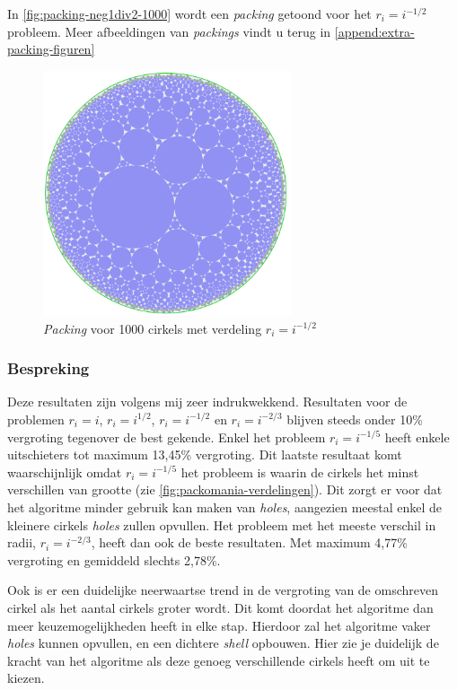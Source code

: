 \documentclass[12pt,a4paper,oneside]{book}
\begin{document}
{In \autoref{fig:packing-neg1div2-1000} wordt een \textit{packing} getoond voor het $r_i = i^{-1/2}$ probleem.
Meer afbeeldingen van \textit{packings} vindt u terug in \autoref{append:extra-packing-figuren}

\begin{figure}
  \centering
  \includegraphics[width=0.65\textwidth]{packing-neg1div2-1000.png}
  \caption{\textit{Packing} voor 1000 cirkels met verdeling $r_i=i^{-1/2}$} \label{fig:packing-neg1div2-1000} 
\end{figure}

\subsubsection{Bespreking}

Deze resultaten zijn volgens mij zeer indrukwekkend.
Resultaten voor de problemen $r_i = i$, $r_i = i^{1/2}$, $r_i = i^{-1/2}$ en $r_i = i^{-2/3}$ blijven steeds onder 10\% vergroting tegenover de best gekende.
Enkel het probleem $r_i = i^{-1/5}$ heeft enkele uitschieters tot maximum 13,45\% vergroting.
Dit laatste resultaat komt waarschijnlijk omdat $r_i = i^{-1/5}$ het probleem is waarin de cirkels het minst verschillen van grootte (zie \autoref{fig:packomania-verdelingen}).
Dit zorgt er voor dat het algoritme minder gebruik kan maken van \textit{holes}, aangezien meestal enkel de kleinere cirkels \textit{holes} zullen opvullen.
Het probleem met het meeste verschil in radii, $r_i = i^{-2/3}$, heeft dan ook de beste resultaten.
Met maximum 4,77\% vergroting en gemiddeld slechts 2,78\%.

Ook is er een duidelijke neerwaartse trend in de vergroting van de omschreven cirkel als het aantal cirkels groter wordt.
Dit komt doordat het algoritme dan meer keuzemogelijkheden heeft in elke stap.
Hierdoor zal het algoritme vaker \textit{holes} kunnen opvullen, en een dichtere \textit{shell} opbouwen.
Hier zie je duidelijk de kracht van het algoritme als deze genoeg verschillende cirkels heeft om uit te kiezen.

}
\end{document}
